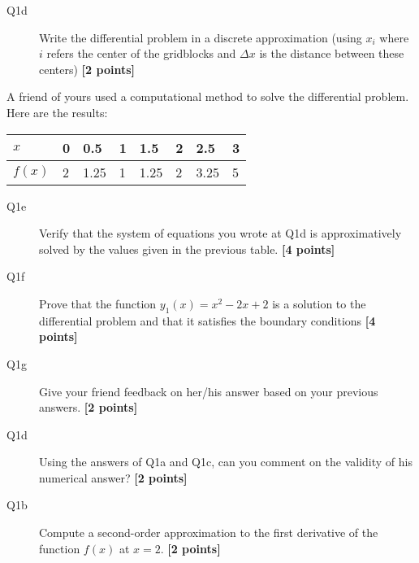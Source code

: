 \documentclass{article}
\begin{document}
\begin{description}
\item [Q1d] Write the differential problem in a discrete approximation (using $x_i$ where $i$ refers the center of the gridblocks and $\Delta x$ is the distance between these centers) \textbf{[2 points]}
\vspace{4.5cm}

\end{description}

A friend of yours used a computational method to solve the differential problem. Here are the results: 
\begin{center}
\begin{tabular}{|l|lllllll|}
\hline
$x$ & 0 & 0.5 &  1 & 1.5 & 2 & 2.5 & 3 \\ \hline
$f(x)$ & 2  &  1.25  &  1  &  1.25 &   2 &    3.25 &    5  \\ 
\hline
\end{tabular}
\end{center}

\begin{description}

\item [Q1e] Verify that the system of equations you wrote at Q1d is approximatively solved by the values given in the previous table. \textbf{[4 points]}
\vspace{5cm}


\item [Q1f] Prove that the function $y_1(x) = x^2-2x+2$ is a solution to the differential problem and that it satisfies the boundary conditions \textbf{[4 points]}
\vspace{3cm}

\item [Q1g] Give your friend feedback on her/his answer based on your previous answers.  \textbf{[2 points]}
\vspace{3cm}


\end{description}





\begin{description}
\item [Q1d] Using the answers of Q1a and Q1c, can you comment on the validity of his numerical answer? \textbf{[2 points]}
\vspace{3cm}
\item [Q1b] Compute a second-order approximation to the first derivative of the function $f(x)$ at $x = 2$.  \textbf{[2 points]}
\vspace{3.5cm}

\end{description}
\end{document}
